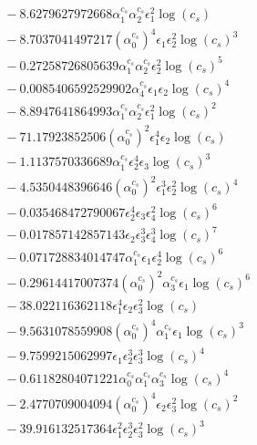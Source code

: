 \documentclass[10pt]{article}
\begin{document}
\begin{align*}
&{}  - 8.6279627972668 \alpha_{1}^{c_s} \alpha_{2}^{c_s} \epsilon_{1}^{2} \log{\left(c_{s} \right)} \\
&{}  - 8.7037041497217 \left(\alpha_{0}^{c_s}\right)^{4} \epsilon_{1} \epsilon_{2}^{2} \log{\left(c_{s} \right)}^{3} \\
&{}  - 0.27258726805639 \alpha_{1}^{c_s} \alpha_{2}^{c_s} \epsilon_{2}^{2} \log{\left(c_{s} \right)}^{5} \\
&{}  - 0.0085406592529902 \alpha_{4}^{c_s} \epsilon_{1} \epsilon_{2} \log{\left(c_{s} \right)}^{4} \\
&{}  - 8.8947641864993 \alpha_{1}^{c_s} \alpha_{2}^{c_s} \epsilon_{1}^{2} \log{\left(c_{s} \right)}^{2} \\
&{}  - 71.17923852506 \left(\alpha_{0}^{c_s}\right)^{2} \epsilon_{1}^{4} \epsilon_{2} \log{\left(c_{s} \right)} \\
&{}  - 1.1137570336689 \alpha_{1}^{c_s} \epsilon_{2}^{4} \epsilon_{3} \log{\left(c_{s} \right)}^{3} \\
&{}  - 4.5350448396646 \left(\alpha_{0}^{c_s}\right)^{2} \epsilon_{1}^{3} \epsilon_{2}^{2} \log{\left(c_{s} \right)}^{4} \\
&{}  - 0.035468472790067 \epsilon_{2}^{4} \epsilon_{3} \epsilon_{4}^{2} \log{\left(c_{s} \right)}^{6} \\
&{}  - 0.017857142857143 \epsilon_{2} \epsilon_{3}^{3} \epsilon_{4}^{3} \log{\left(c_{s} \right)}^{7} \\
&{}  - 0.071728834014747 \alpha_{1}^{c_s} \epsilon_{1} \epsilon_{2}^{4} \log{\left(c_{s} \right)}^{6} \\
&{}  - 0.29614417007374 \left(\alpha_{0}^{c_s}\right)^{2} \alpha_{3}^{c_s} \epsilon_{1} \log{\left(c_{s} \right)}^{6} \\
&{}  - 38.022116362118 \epsilon_{1}^{4} \epsilon_{2} \epsilon_{3}^{2} \log{\left(c_{s} \right)} \\
&{}  - 9.5631078559908 \left(\alpha_{0}^{c_s}\right)^{4} \alpha_{1}^{c_s} \epsilon_{1} \log{\left(c_{s} \right)}^{3} \\
&{}  - 9.7599215062997 \epsilon_{1} \epsilon_{2}^{3} \epsilon_{3}^{3} \log{\left(c_{s} \right)}^{4} \\
&{}  - 0.61182804071221 \alpha_{0}^{c_s} \alpha_{1}^{c_s} \alpha_{3}^{c_s} \log{\left(c_{s} \right)}^{4} \\
&{}  - 2.4770709004094 \left(\alpha_{0}^{c_s}\right)^{4} \epsilon_{2} \epsilon_{3}^{2} \log{\left(c_{s} \right)}^{2} \\
&{}  - 39.916132517364 \epsilon_{1}^{2} \epsilon_{2}^{3} \epsilon_{3}^{2} \log{\left(c_{s} \right)}^{3} \\

\end{align*}
\end{document}
